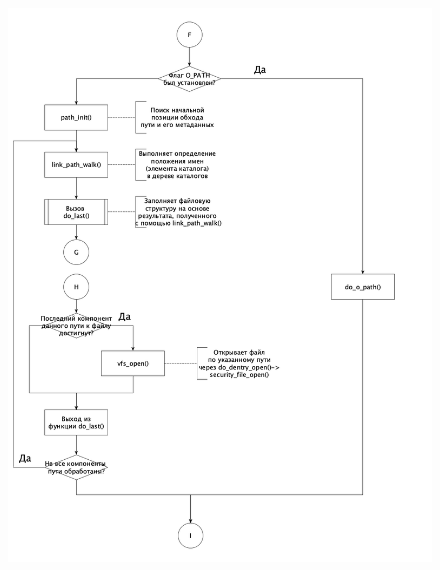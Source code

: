 \documentclass[a4paper,12pt]{article}
\begin{document}
	\begin{figure}[h!]
		\begin{center}
			{\includegraphics[scale = 0.8]{5.png}}
			\label{5}
		\end{center}
	\end{figure}
\end{document}
